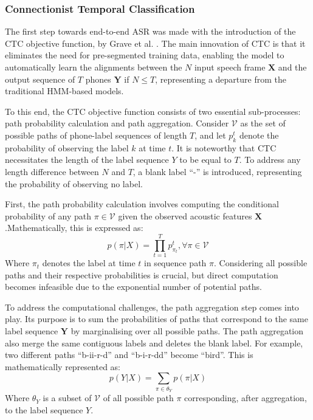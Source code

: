  \subsubsection{Connectionist Temporal Classification}
 The first step towards end-to-end \ac{ASR} was made with the introduction of the \ac{CTC} objective function, by Grave et al. \cite{First_End2End}. The main innovation of \ac{CTC} is that it eliminates the need for pre-segmented training data, enabling the model to automatically learn the alignments between the $N$ input speech frame $\boldsymbol{X}$ and the output sequence of $T$ phones $\boldsymbol{Y}$ if $N \leq T$, representing a departure from the traditional HMM-based models.

 To this end, the \ac{CTC} objective function consists of two essential sub-processes: path probability calculation and path aggregation. Consider $\mathcal{V}$ as the set of possible paths of phone-label sequences of length $T$, and let $p^t_k$ denote the probability of observing the label $k$ at time $t$. It is noteworthy that \ac{CTC} necessitates the length of the label sequence $Y$ to be equal to $T$. To address any length difference between $N$ and $T$, a blank label ``-'' is introduced, representing the probability of observing no label. 
 
 First, the path probability calculation involves computing the conditional probability of any path $\pi \in \mathcal{V}$ given the observed acoustic features $\boldsymbol{X}$.Mathematically, this is expressed as:
 \begin{equation}
    p(\pi|X) = \prod_{t=1}^{T}p_{\pi_t}^{t} , \forall \pi \in \mathcal{V}
\end{equation}
 Where $\pi_t$ denotes the label at time $t$ in sequence path $\pi$. Considering all possible paths and their respective probabilities is crucial, but direct computation becomes infeasible due to the exponential number of potential paths.
 
 To address the computational challenges, the path aggregation step comes into play. Its purpose is to sum the probabilities of paths that correspond to the same label sequence $\boldsymbol{Y}$ by marginalising over all possible paths. The path aggregation also merge the same contiguous labels and deletes the blank label. For example, two different paths ``b-ii-r-d'' and ``b-i-r-dd'' become ``bird''. This is mathematically represented as:
\begin{equation}
    p(Y|X) = \sum_{\pi \in \theta_Y}p(\pi|X)
\end{equation}
Where $\theta_Y$ is a subset of $\mathcal{V}$ of all possible path $\pi$ corresponding, after aggregation, to the label sequence $Y$.

